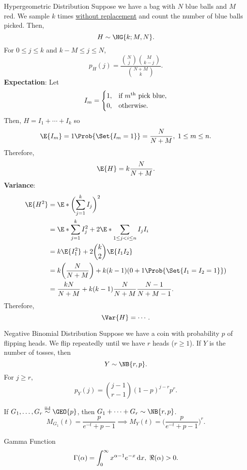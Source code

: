 \begin{Definition}{Hypergeometric Distribution}{}
    Suppose we have a bag with $ N $ blue balls and $ M $
    red. We sample $ k $ times \underline{without
        replacement} and count the number of blue balls picked.
    Then,
    \[ H\sim\HG{k;M,N}. \] For $ 0\le j\le k $ and $ k-M\le
        j\le N $,
    \[
        p_H(j)=\frac{\binom{N}{j}\binom{M}{k-j}}{\binom{N+M}{k}}.
    \]
    \tcblower{}
    \textbf{Expectation}: Let
    \[ I_m=\begin{cases} 1, & \text{if $
              m\textsuperscript{th} $ pick blue}, \\
              0, & \text{otherwise}.\end{cases} \] Then, $
        H=I_1+\cdots+I_k $ so
    \[ \E{I_m}=1\Prob{\Set{I_m=1}}=\frac{N}{N+M},\; 1\le
        m\le n. \] Therefore,
    \[ \E{H}=k \frac{N}{N+M}. \] \textbf{Variance}:
    \begin{align*}
        \E{H^2}
         & =\E*{\biggl(\sum_{j=1}^{k}I_j\biggr)^2}                         \\
         & =\E*{\sum_{j=1}^{k}I_j^2}+2\E*{\sum_{1\le j<i\le n}I_j I_i}     \\
         & =k\E{I_1^2}+2\binom{k}{2}\E{I_1 I_2}                            \\
         & =k\biggl(\frac{N}{N+M}\biggr)+k(k-1)(0+1\Prob{\Set{I_1=I_2=1}}) \\
         & =\frac{kN}{N+M}+k(k-1)\frac{N}{N+M}\frac{N-1}{N+M-1}.
    \end{align*}
    Therefore,
    \[ \Var{H}=\cdots. \]
\end{Definition}
\begin{Definition}{Negative Binomial Distribution}{}
    Suppose we have a coin with probability $ p $ of
    flipping heads. We flip repeatedly until we have $ r $
    heads ($ r\ge 1 $). If $ Y $ is the number of tosses,
    then
    \[ Y\sim\NB{r,p}. \] For $ j\ge r $,
    \[ p_Y(j)=\binom{j-1}{r-1}(1-p)^{j-r}p^r. \]
\end{Definition}
\begin{Example}{}{}
    If $ G_1,\ldots,G_r\iid \GEO{p} $, then $
        G_1+\cdots+G_r\sim\NB{r,p} $.
    \[ M_{G_1}(t)=\frac{p}{e^{-t}+p-1}\implies
        M_Y(t)=\biggl(\frac{p}{e^{-t}+p-1}\biggr)^{\! r}. \]
\end{Example}
\begin{Definition}{Gamma Function}{}
    \[
        \Gamma(\alpha)=\int_{0}^{\infty}x^{\alpha-1}e^{-x}\odif{x},\;
        \Re(\alpha)>0. \]
\end{Definition}

